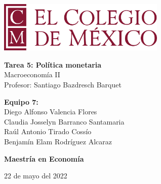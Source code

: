 \begin{titlepage}
   \begin{center}
       \vspace*{1cm}
      
        \includegraphics[width=0.6\textwidth]{COLMEX.png}
        
        \vspace*{1cm}

       \textbf{Tarea 5: Política monetaria} \\
        Macroeconomía II \\
        \vspace{0.5cm}
        Profesor: Santiago Bazdresch Barquet
            
       \vspace{1.5cm}

       \textbf{Equipo 7:} \\
       \vspace{0.5cm}
        Diego Alfonso Valencia Flores\\
	Claudia Josselyn Barranco Santamaria\\
        Raúl Antonio Tirado Cossío \\ 
        Benjamín Elam Rodríguez Alcaraz
       
       

       \vspace{1.5cm}
            
       \textbf{Maestría en Economía}\\
            
       \vspace{0.8cm}
     
            
        22 de mayo del 2022
            
   \end{center}
\end{titlepage}